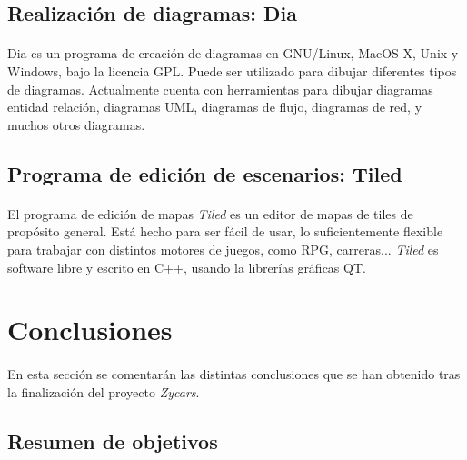 \documentclass[a4paper,11pt]{article} %
\begin{document}
\subsection{Realización de diagramas: Dia}

\paragraph{}
Dia es un programa de creación de diagramas en GNU/Linux, MacOS X, Unix y Windows, bajo la 
licencia GPL. Puede ser utilizado para dibujar diferentes tipos de diagramas. Actualmente cuenta con herramientas para dibujar 
diagramas entidad relación, diagramas UML, diagramas de flujo, diagramas de red, y muchos otros diagramas.

\subsection{Programa de edición de escenarios: Tiled}

\paragraph{}
El programa de edición de mapas \emph{Tiled} es
un editor de mapas de tiles de propósito general.
Está hecho para ser fácil de usar, lo suficientemente flexible para trabajar con distintos motores de juegos, como RPG, carreras... 
\emph{Tiled} es software libre y escrito en C++, usando la librerías gráficas QT.

\section{Conclusiones}

\paragraph{}
En esta sección se comentarán las distintas conclusiones que se han obtenido tras la finalización del proyecto \emph{Zycars}.

\subsection{Resumen de objetivos}
\end{document}
